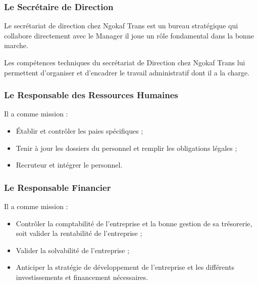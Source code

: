             \subsubsection[Le Secrétaire de Direction]{Le Secrétaire de Direction}
            Le secrétariat de direction chez Ngokaf Trans est un bureau stratégique
            qui collabore directement avec le Manager il joue un rôle fondamental dans
            la bonne marche.
            \par\noindent
            Les compétences techniques du secrétariat de Direction chez Ngokaf Trans
            lui permettent d’organiser et d’encadrer le travail administratif dont il a la charge.

            \subsubsection[Le Responsable des Ressources Humaines]{Le Responsable des Ressources Humaines}
            Il a comme mission :
            \par
                \begin{itemize}
                    \setlength{\itemsep}{0pt}
                    \item [\ding{226}] Établir et contrôler les paies spécifiques ;
                    \item [\ding{226}] Tenir à jour les dossiers du personnel et remplir les obligations légales ;
                    \item [\ding{226}] Recruteur et intégrer le personnel.
                \end{itemize} 
            \subsubsection[Le Responsable Financier]{Le Responsable Financier}
            Il a comme mission :
            \par
                \begin{itemize}
                    \setlength{\itemsep}{0pt}
                    \item [\ding{226}] Contrôler la comptabilité de l’entreprise et la bonne
                    gestion de sa trésorerie, soit valider la rentabilité de l’entreprise ;
                    \item [\ding{226}] Valider la solvabilité de l’entreprise ;
                    \item [\ding{226}] Anticiper la stratégie de développement de l’entreprise
                    et les différents investissements et financement nécessaires.
                \end{itemize}

